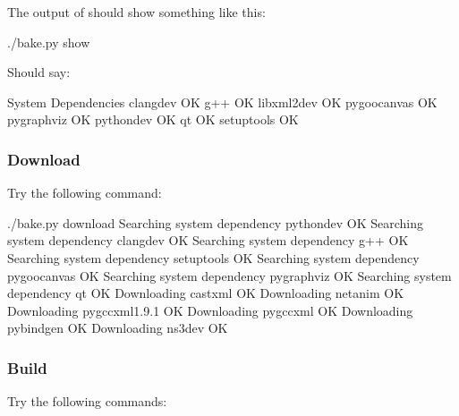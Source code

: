\documentclass[letterpaper,10pt,english]{sphinxmanual}
\renewcommand{\sphinxcode}[1]{\texttt{\small{#1}}}
\begin{document}
The output of \sphinxcode{} should show something like this:

\begin{sphinxVerbatim}[commandchars=\\\{\}]
\PYGZdl{} ./bake.py show
\end{sphinxVerbatim}

Should say:

\begin{sphinxVerbatim}[commandchars=\\\{\}]
\PYGZhy{}\PYGZhy{} System Dependencies \PYGZhy{}\PYGZhy{}
 \PYGZgt{} clang\PYGZhy{}dev \PYGZhy{} OK
 \PYGZgt{} g++ \PYGZhy{} OK
 \PYGZgt{} libxml2\PYGZhy{}dev \PYGZhy{} OK
 \PYGZgt{} pygoocanvas \PYGZhy{} OK
 \PYGZgt{} pygraphviz \PYGZhy{} OK
 \PYGZgt{} python\PYGZhy{}dev \PYGZhy{} OK
 \PYGZgt{} qt \PYGZhy{} OK
 \PYGZgt{} setuptools \PYGZhy{} OK
\end{sphinxVerbatim}


\subsubsection{Download}
\label{\detokenize{python:download}}
Try the following command:

\begin{sphinxVerbatim}[commandchars=\\\{\}]
\PYGZdl{} ./bake.py download
 \PYGZgt{}\PYGZgt{} Searching  system dependency python\PYGZhy{}dev \PYGZhy{} OK
 \PYGZgt{}\PYGZgt{} Searching  system dependency clang\PYGZhy{}dev \PYGZhy{} OK
 \PYGZgt{}\PYGZgt{} Searching  system dependency g++ \PYGZhy{} OK
 \PYGZgt{}\PYGZgt{} Searching  system dependency setuptools \PYGZhy{} OK
 \PYGZgt{}\PYGZgt{} Searching  system dependency pygoocanvas \PYGZhy{} OK
 \PYGZgt{}\PYGZgt{} Searching  system dependency pygraphviz \PYGZhy{} OK
 \PYGZgt{}\PYGZgt{} Searching  system dependency qt \PYGZhy{} OK
 \PYGZgt{}\PYGZgt{} Downloading castxml \PYGZhy{} OK
 \PYGZgt{}\PYGZgt{} Downloading netanim \PYGZhy{} OK
 \PYGZgt{}\PYGZgt{} Downloading pygccxml\PYGZhy{}1.9.1 \PYGZhy{} OK
 \PYGZgt{}\PYGZgt{} Downloading pygccxml \PYGZhy{} OK
 \PYGZgt{}\PYGZgt{} Downloading pybindgen \PYGZhy{} OK
 \PYGZgt{}\PYGZgt{} Downloading ns\PYGZhy{}3\PYGZhy{}dev \PYGZhy{} OK
\end{sphinxVerbatim}


\subsubsection{Build}
\label{\detokenize{python:build}}
Try the following commands:
\end{document}
